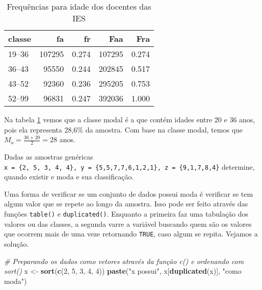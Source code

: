 \documentclass[12pt,]{style/krantz}
\makeatletter
\newenvironment{Shaded}{\begin{snugshade}}{\end{snugshade}}
\newcommand{\CommentTok}[1]{\textcolor[rgb]{0.56,0.35,0.01}{\textit{#1}}}
\newcommand{\DecValTok}[1]{\textcolor[rgb]{0.00,0.00,0.81}{#1}}
\newcommand{\KeywordTok}[1]{\textcolor[rgb]{0.13,0.29,0.53}{\textbf{#1}}}
\newcommand{\NormalTok}[1]{#1}
\newcommand{\StringTok}[1]{\textcolor[rgb]{0.31,0.60,0.02}{#1}}
\newenvironment{kframe}{%
\medskip{}
\setlength{\fboxsep}{.8em}
 \def\at@end@of@kframe{}%
 \ifinner\ifhmode%
  \def\at@end@of@kframe{\end{minipage}}%
  \begin{minipage}{\columnwidth}%
 \fi\fi%
 \def\FrameCommand##1{\hskip\@totalleftmargin \hskip-\fboxsep
 \colorbox{shadecolor}{##1}\hskip-\fboxsep
     \hskip-\linewidth \hskip-\@totalleftmargin \hskip\columnwidth}%
 \MakeFramed {\advance\hsize-\width
   \@totalleftmargin\z@ \linewidth\hsize
   \@setminipage}}%
 {\par\unskip\endMakeFramed%
 \at@end@of@kframe}
\renewenvironment{Shaded}{\begin{kframe}}{\end{kframe}}
\theoremstyle{definition}
\theoremstyle{definition}
\theoremstyle{definition}
\theoremstyle{remark}
\let\BeginKnitrBlock\begin \let\EndKnitrBlock\end
\makeatother
\begin{document}
\begin{table}[!h]

\caption{\label{tab:tab08}Frequências para idade dos docentes das IES}
\centering
\begin{tabular}{lrrrr}
\toprule
classe & fa & fr & Faa & Fra\\
\midrule
19--36 & 107295 & 0.274 & 107295 & 0.274\\
36--43 & 95550 & 0.244 & 202845 & 0.517\\
43--52 & 92360 & 0.236 & 295205 & 0.753\\
52--99 & 96831 & 0.247 & 392036 & 1.000\\
\bottomrule
\end{tabular}
\end{table}

Na tabela \ref{tab:tab08} vemos que a classe modal é a que contém idades entre 20 e 36 anos, pois ela representa 28,6\% da amostra. Com base na classe modal, temos que \(M_o = \frac{36+20}{2} = 28\) anos.

\BeginKnitrBlock{example}
\protect\hypertarget{exm:unnamed-chunk-44}{}{\label{exm:unnamed-chunk-44} }Dadas as amostras genéricas \texttt{x\ =\ \{2,\ 5,\ 3,\ 4,\ 4\},\ y\ =\ \{5,5,7,7,6,1,2,1\},\ z\ =\ \{9,1,7,8,4\}} determine, quando existir e moda e sua classificação.
\EndKnitrBlock{example}

Uma forma de verificar se um conjunto de dados possui moda é verificar se tem algum valor que se repete ao longo da amostra. Isso pode ser feito através das funções \texttt{table()} e \texttt{duplicated()}. Enquanto a primeira faz uma tabulação dos valores ou das classes, a segunda varre a variável buscando quem são os valores que ocorrem mais de uma veze retornando \texttt{TRUE}, caso algum se repita. Vejamos a solução.

\begin{Shaded}
\begin{Highlighting}[]
\CommentTok{# Preparando os dados como vetores através da função c() e ordenando com sort()}
\NormalTok{x <-}\StringTok{ }\KeywordTok{sort}\NormalTok{(}\KeywordTok{c}\NormalTok{(}\DecValTok{2}\NormalTok{, }\DecValTok{5}\NormalTok{, }\DecValTok{3}\NormalTok{, }\DecValTok{4}\NormalTok{, }\DecValTok{4}\NormalTok{))}
\KeywordTok{paste}\NormalTok{(}\StringTok{"x possui"}\NormalTok{, x[}\KeywordTok{duplicated}\NormalTok{(x)], }\StringTok{"como moda"}\NormalTok{)}
\end{Highlighting}
\end{Shaded}
\end{document}
